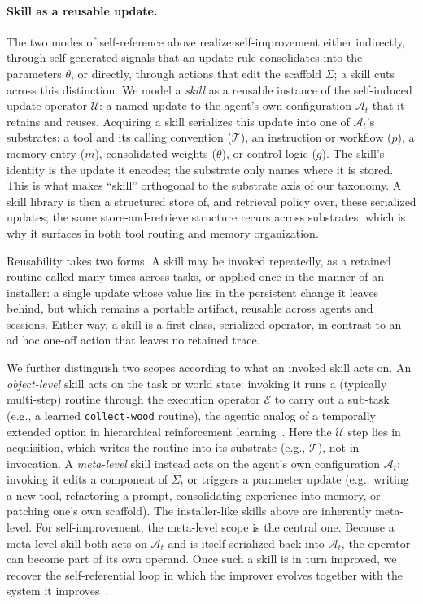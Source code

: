 \documentclass{article}
\begin{document}
\paragraph{Skill as a reusable update.}
The two modes of self-reference above realize self-improvement either indirectly, through self-generated signals that an update rule consolidates into the parameters $\theta$, or directly, through actions that edit the scaffold $\Sigma$; a skill cuts across this distinction. We model a \emph{skill} as a reusable instance of the self-induced update operator $\mathcal{U}$: a named update to the agent's own configuration $\mathcal{A}_t$ that it retains and reuses. Acquiring a skill serializes this update into one of $\mathcal{A}_t$'s substrates: a tool and its calling convention ($\mathcal{T}$), an instruction or workflow ($p$), a memory entry ($m$), consolidated weights ($\theta$), or control logic ($g$). The skill's identity is the update it encodes; the substrate only names where it is stored. This is what makes ``skill'' orthogonal to the substrate axis of our taxonomy. A skill library is then a structured store of, and retrieval policy over, these serialized updates; the same store-and-retrieve structure recurs across substrates, which is why it surfaces in both tool routing and memory organization.

Reusability takes two forms. A skill may be invoked repeatedly, as a retained routine called many times across tasks, or applied once in the manner of an installer: a single update whose value lies in the persistent change it leaves behind, but which remains a portable artifact, reusable across agents and sessions. Either way, a skill is a first-class, serialized operator, in contrast to an ad hoc one-off action that leaves no retained trace.

We further distinguish two scopes according to what an invoked skill acts on. An \emph{object-level} skill acts on the task or world state: invoking it runs a (typically multi-step) routine through the execution operator $\mathcal{E}$ to carry out a sub-task (e.g., a learned \texttt{collect-wood} routine), the agentic analog of a temporally extended option in hierarchical reinforcement learning~\citep{sutton1999between, bacon2017option}. Here the $\mathcal{U}$ step lies in acquisition, which writes the routine into its substrate (e.g., $\mathcal{T}$), not in invocation. A \emph{meta-level} skill instead acts on the agent's own configuration $\mathcal{A}_t$: invoking it edits a component of $\Sigma_t$ or triggers a parameter update (e.g., writing a new tool, refactoring a prompt, consolidating experience into memory, or patching one's own scaffold). The installer-like skills above
are inherently meta-level. For self-improvement, the meta-level scope is the central one. Because a meta-level skill both acts on $\mathcal{A}_t$ and is itself serialized back into $\mathcal{A}_t$, the operator can become part of its own operand. Once such a skill is in turn improved, we recover the self-referential loop in which the improver evolves together with the system it improves~\citep{schmidhuber1987selfreferential, schmidhuber1993self,schmidhuber2003godel}.
\end{document}
